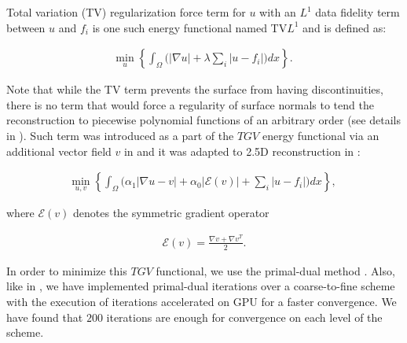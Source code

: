 \documentclass[10pt,twocolumn,letterpaper]{article}
\begin{document}
Total variation (TV) regularization force term for $u$ with an $L^1$ data fidelity term between $u$ and $f_i$ is one such energy functional named TV$L^1$ \cite{zach2007globally} and is defined as:

\begin{align}
    \min_{u} \left\{
        \int_{\Omega} \Big(
            |\nabla u| + \lambda \sum_{i} |u - f_i|
        \Big) dx
    \right\}.\;
    \label{fig:tvl1}
\end{align}

Note that while the TV term prevents the surface from having discontinuities, there is no term that would force a regularity of surface normals
to tend the reconstruction to piecewise polynomial functions of an arbitrary order (see details in \cite{pock2011tgv}).
Such term was introduced as a part of the $TGV$ energy functional via an additional vector field $v$ in \cite{bredies2010total} and it was adapted to 2.5D reconstruction in \cite{pock2011tgv}:

\begin{align}
    \min_{u, v} \left\{
        \int_{\Omega} \Big(
            \alpha_1 |\nabla u - v| + \alpha_0 |\mathcal{E} (v)| + \sum_{i} |u - f_i|
        \Big) dx
    \right\},\;
    \label{fig:tgv}
\end{align}

where $\mathcal{E} (v)$ denotes the symmetric gradient operator

\begin{align}
    \mathcal{E} (v) = \frac{\nabla v + \nabla v^T}{2}.
    \label{fig:tgv_e}
\end{align}

In order to minimize this $TGV$ functional, we use the primal-dual method \cite{pock2011tgv}.
Also, like in \cite{zach2007globally}, we have implemented primal-dual iterations over a coarse-to-fine scheme with the execution of iterations accelerated on GPU for a faster convergence.
We have found that $200$ iterations are enough for convergence on each level of the scheme.
\end{document}
